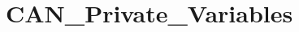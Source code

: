 \hypertarget{group___c_a_n___private___variables}{}\section{C\+A\+N\+\_\+\+Private\+\_\+\+Variables}
\label{group___c_a_n___private___variables}
